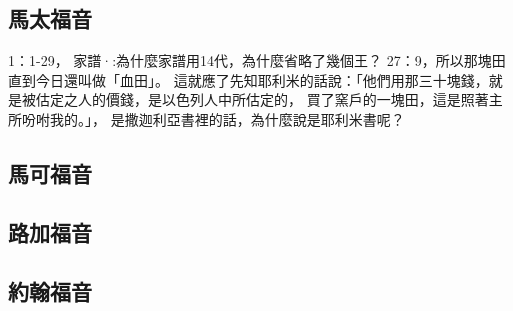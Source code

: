 \subsection{馬太福音}
1：1-29， 家譜·:為什麼家譜用14代，為什麼省略了幾個王？
27：9，所以那塊田直到今日還叫做「血田」。 這就應了先知耶利米的話說：「他們用那三十塊錢，就是被估定之人的價錢，是以色列人中所估定的， 買了窯戶的一塊田，這是照著主所吩咐我的。」， 是撒迦利亞書裡的話，為什麼說是耶利米書呢？

\subsection{馬可福音}
\subsection{路加福音}
\subsection{約翰福音}
